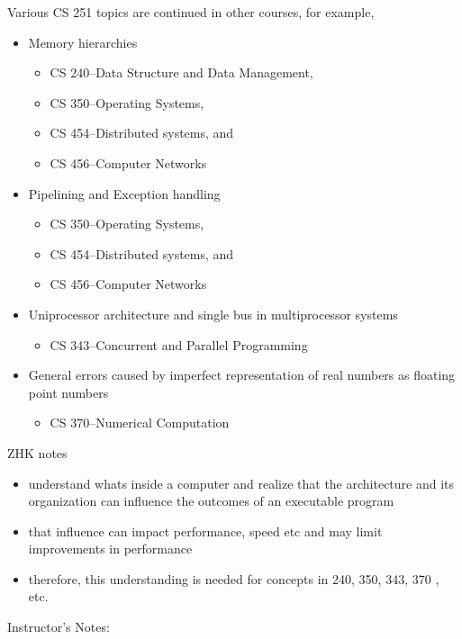 \begin{frame}[fragile]
Various CS 251 topics are continued in other courses, for example,
\begin{itemize}
\item Memory	hierarchies
  
\begin{itemize}
    \item CS 240--Data Structure and Data Management,
    \item CS 350--Operating Systems,
    \item CS 454--Distributed systems, and
 \item CS 456--Computer Networks
\end{itemize}
\item Pipelining and Exception handling 
\begin{itemize}
\item CS 350--Operating Systems, 
\item CS 454--Distributed systems, and
\item CS 456--Computer Networks
  \end{itemize}
\item Uniprocessor architecture and single bus in multiprocessor systems
\begin{itemize}
    \item CS 343--Concurrent and Parallel Programming
\end{itemize}

\item  General errors caused by imperfect representation of real numbers as floating point numbers
\begin{itemize}
    \item CS 370--Numerical Computation
\end{itemize}
\end{itemize}

\BNotes

\ifnum{}

ZHK notes
\begin{itemize}
    \item understand whats inside a computer and realize that the architecture and its organization can influence the outcomes of an executable program
    \item that influence can impact performance, speed etc and may limit improvements in performance
\item therefore, this understanding is needed for concepts in 240, 350, 343, 370 , etc. 
\end{itemize}
Instructor's Notes:
\begin{itemize}


\end{itemize}
\end{frame}
